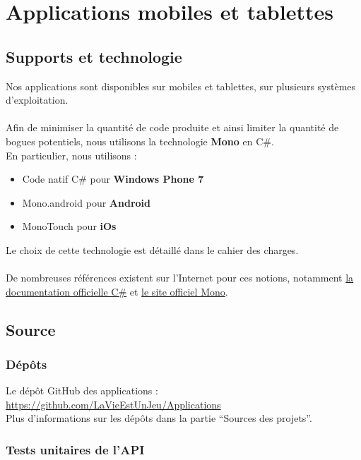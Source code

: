 \documentclass{life-fr}
\begin{document}

\chapter{Applications mobiles et tablettes}

\section{Supports et technologie}

Nos applications sont disponibles sur mobiles et tablettes, sur plusieurs
systèmes d'exploitation.\\
\\
Afin de minimiser la quantité de code produite et ainsi limiter la
quantité de bogues potentiels, nous utilisons la technologie \textbf{Mono}
en C\#.\\
En particulier, nous utilisons :
\begin{itemize}
  \item Code natif C\# pour \textbf{Windows Phone 7}
  \item Mono.android pour \textbf{Android}
  \item MonoTouch pour \textbf{iOs}
\end{itemize}

Le choix de cette technologie est détaillé dans le cahier des charges.\\
\\
De nombreuses références existent sur l'Internet pour ces notions, notamment
\href{http://msdn.microsoft.com/en-us/vstudio/hh341490.aspx}{la documentation
officielle C\#} et \href{http://www.mono-project.com/}{le site officiel Mono}.

\section{Source}

\subsection{Dépôts}

Le dépôt GitHub des applications :
\url{https://github.com/LaVieEstUnJeu/Applications}\\
Plus d'informations sur les dépôts dans la partie ``Sources des projets''.

\subsection{Tests unitaires de l'API}
\end{document}
